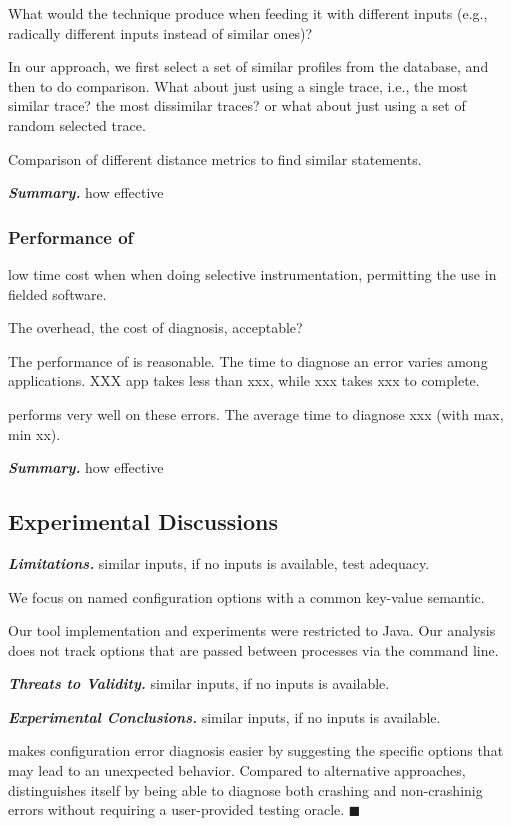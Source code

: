 What would the technique produce when feeding it with different inputs (e.g.,
radically different inputs instead of similar ones)?

In our approach, we first select a set of similar profiles from the  database,
and then to do comparison. What about just using a single trace, i.e., the
most similar trace? the most dissimilar traces? or what about just using a set
of random selected trace.

Comparison of different distance metrics to find similar statements.

\vspace{1mm}
\noindent \textbf{\textit{Summary.}} how effective

\subsubsection{Performance of \ourtool}
low time cost when when doing
selective instrumentation, permitting the use in fielded software.

The overhead, the cost of diagnosis, acceptable?

The performance of \ourtool is reasonable. The time to diagnose
an error varies among applications.  XXX app takes less than xxx,
while xxx takes xxx to complete.

\ourtool performs very well on these errors. The average time
to diagnose xxx (with max, min xx).

\vspace{1mm}
\noindent \textbf{\textit{Summary.}} how effective

\vspace{1mm}

\subsection{Experimental Discussions}


\noindent \textbf{\textit{Limitations.}} similar inputs, if no inputs is available, test adequacy.

We focus on named configuration options with a common key-value semantic.

Our tool implementation and experiments were restricted to Java. Our analysis
does not track options that are passed between processes via the command line.

\vspace{1mm}

\noindent \textbf{\textit{Threats to Validity.}} similar inputs, if no inputs is available.

\vspace{1mm}

\noindent \textbf{\textit{Experimental Conclusions.}} similar inputs, if no inputs is available.

\ourtool makes configuration error diagnosis easier by suggesting
the specific options that may lead to an unexpected behavior. Compared to
alternative approaches, \ourtool distinguishes itself by being able to
diagnose both crashing and non-crashinig errors without requiring
a user-provided testing oracle. $\blacksquare$
